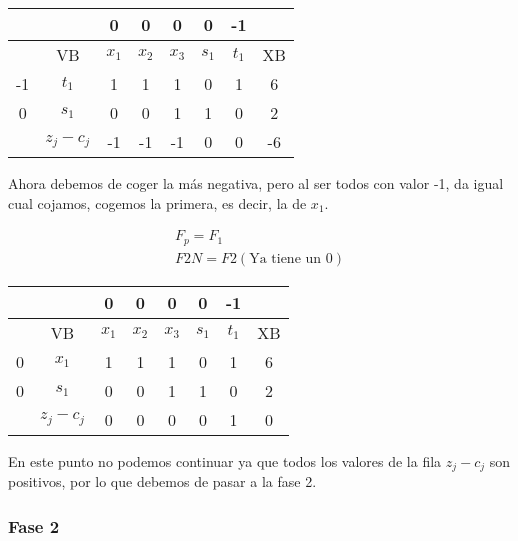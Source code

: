 \begin{itemize}
    \begin{table}[H]
    \centering
    \begin{tabular}{|c|c|c|c|c|c|c|c|}
    \hline
    &  & 0 & 0 & 0 & 0 & -1 &\\
    \hline
    & VB & $x_1$ & $x_2$ & $x_3$ & $s_1$ & $t_1$ & XB \\
    \hline
    -1 & $t_1$ & 1 & 1 & 1 & 0 & 1 & 6\\
    \hline
    0 & $s_1$ & 0 & 0 & 1 & 1& 0 &2\\
    \hline
    & $z_j - c_j$ & -1 & -1 & -1 & 0 & 0 &-6\\
    \hline
    \end{tabular}
    \end{table}

    Ahora debemos de coger la más negativa, pero al ser todos con valor -1, da igual cual cojamos, cogemos la primera, es decir, la de $x_1$.

        \begin{align*}
            F_p = F_1\\
            F2N = F2 (\text{Ya tiene un 0})
        \end{align*}
        

    \begin{table}[H]
        \centering
        \begin{tabular}{|c|c|c|c|c|c|c|c|}
        \hline
        &  & 0 & 0 & 0 & 0 & -1 &\\
        \hline
        & VB & $x_1$ & $x_2$ & $x_3$ & $s_1$ & $t_1$ & XB \\
        \hline
        0 & $x_1$ & 1 & 1 & 1 & 0 & 1 & 6\\
        \hline
        0 & $s_1$ & 0 & 0 & 1 & 1& 0 &2\\
        \hline
        & $z_j - c_j$ & 0 & 0& 0 & 0 & 1 &0\\
        \hline
        \end{tabular}
    \end{table}

    En este punto no podemos continuar ya que todos los valores de la fila $z_j - c_j$ son positivos, por lo que debemos de pasar a la fase 2.

    \subsubsection*{Fase 2}


\end{itemize}
